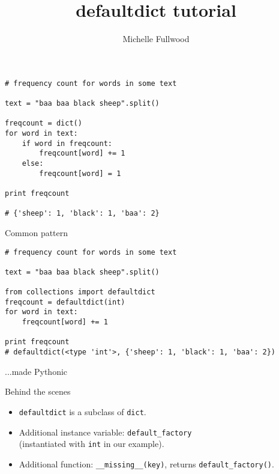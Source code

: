 \documentclass{beamer}
\title[defaultdict]{defaultdict tutorial}
\author{Michelle Fullwood}
\date{}
\begin{document}
\begin{frame}
\titlepage
\end{frame}


\begin{lrbox}{\mysavebox}
\begin{lstlisting}
# frequency count for words in some text

text = "baa baa black sheep".split()

freqcount = dict()
for word in text:
    if word in freqcount:
        freqcount[word] += 1
    else:
        freqcount[word] = 1

print freqcount

# {'sheep': 1, 'black': 1, 'baa': 2}

\end{lstlisting}
\end{lrbox}

\begin{frame}{Common pattern}
\vspace{1.5em}
{\usebox{\mysavebox}}
\vspace{1em}
\end{frame}


\begin{lrbox}{\mysavebox}
\begin{lstlisting}
# frequency count for words in some text

text = "baa baa black sheep".split()

from collections import defaultdict
freqcount = defaultdict(int)
for word in text:
    freqcount[word] += 1

print freqcount
# defaultdict(<type 'int'>, {'sheep': 1, 'black': 1, 'baa': 2})
\end{lstlisting}
\end{lrbox}

\begin{frame}{...made Pythonic}
\vspace{1.5em}
{\usebox{\mysavebox}}
\vspace{1em}
\end{frame}

\begin{frame}{Behind the scenes}

\begin{itemize}
  \item \lstinline$defaultdict$ is a subclass of \lstinline$dict$.
  \item Additional instance variable: \lstinline$default_factory$ \\
        (instantiated with \lstinline$int$ in our example).
  \item Additional function:  \lstinline$__missing__(key)$, returns \lstinline$default_factory()$. 
\end{itemize}
\end{frame}
\end{document}
